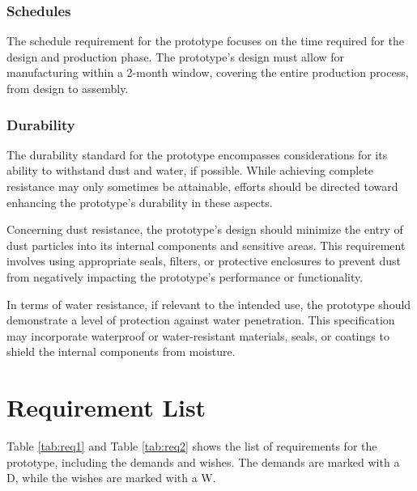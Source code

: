 \subsubsection{Schedules}
The schedule requirement for the prototype focuses on the time required for the design and production phase. The prototype's design must allow for manufacturing within a 2-month window, covering the entire production process, from design to assembly.

\subsubsection{Durability}
The durability standard for the prototype encompasses considerations for its ability to withstand dust and water, if possible. While achieving complete resistance may only sometimes be attainable, efforts should be directed toward enhancing the prototype's durability in these aspects.

Concerning dust resistance, the prototype's design should minimize the entry of dust particles into its internal components and sensitive areas. This requirement involves using appropriate seals, filters, or protective enclosures to prevent dust from negatively impacting the prototype's performance or functionality.

In terms of water resistance, if relevant to the intended use, the prototype should demonstrate a level of protection against water penetration. This specification may incorporate waterproof or water-resistant materials, seals, or coatings to shield the internal components from moisture.

\section{Requirement List}
Table \ref{tab:req1} and Table \ref{tab:req2} shows the list of requirements for the prototype, including the demands and wishes. The demands are marked with a D, while the wishes are marked with a W.

